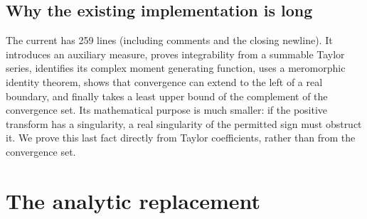 \documentclass[11pt,letterpaper]{article}
\theoremstyle{remark}\newtheorem{remark}[theorem]{Remark}
\newcommand{\decl}[1]{\texttt{\detokenize{#1}}}
\begin{document}
\subsection{Why the existing implementation is long}
The current \decl{Landau.lean} has 259 lines (including comments and the closing newline). It introduces an auxiliary measure, proves integrability from a summable Taylor series, identifies its complex moment generating function, uses a meromorphic identity theorem, shows that convergence can extend to the left of a real boundary, and finally takes a least upper bound of the complement of the convergence set. Its mathematical purpose is much smaller: if the positive transform has a singularity, a real singularity of the permitted sign must obstruct it. We prove this last fact directly from Taylor coefficients, rather than from the convergence set.

\section{The analytic replacement}
\end{document}
